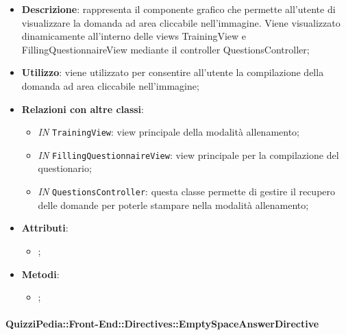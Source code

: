		\begin{itemize}
			\item \textbf{Descrizione}: rappresenta il componente grafico che permette all'utente di visualizzare la domanda ad area cliccabile nell'immagine. Viene visualizzato dinamicamente all'interno delle views TrainingView e FillingQuestionnaireView mediante il controller QuestionsController;
			\item \textbf{Utilizzo}: viene utilizzato per consentire all'utente la compilazione della domanda ad area cliccabile nell'immagine;
			\item \textbf{Relazioni con altre classi}: 
			\begin{itemize}
				\item \textit{IN} \texttt{TrainingView}: view principale della modalità allenamento; 
				\item \textit{IN} \texttt{FillingQuestionnaireView}: view principale per la compilazione del questionario;
				\item \textit{IN} \texttt{QuestionsController}: questa classe permette di gestire il recupero delle domande per poterle stampare nella modalità allenamento;
				
			\end{itemize}
			\item \textbf{Attributi}: 
			\begin{itemize}
				\item ;
			\end{itemize}
			\item \textbf{Metodi}: 
			\begin{itemize}
				\item ;
			\end{itemize}
		\end{itemize}
	
		\paragraph{QuizziPedia::Front-End::Directives::EmptySpaceAnswerDirective}
		
		\label{QuizziPedia::Front-End::Directives::EmptySpaceAnswerDirective}
		
